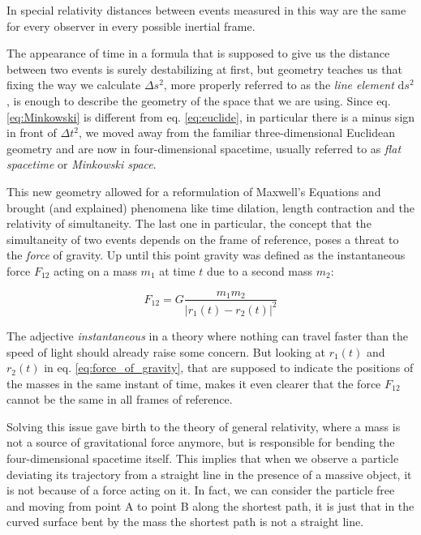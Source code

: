 In special relativity distances between events measured in this way are the same
for every observer in every possible inertial frame.

The appearance of time in a formula that is supposed to give us the distance
between two events is surely destabilizing at first, but geometry teaches us
that fixing the way we calculate $\Delta s^2$, more properly referred to as the
\textit{line element} $\mathrm{d}s^2$, is enough to describe the geometry of
the space that we are using.
Since eq. \ref{eq:Minkowski} is different from eq. \ref{eq:euclide},
in
particular there is a minus sign in front of $\Delta t^2$, we moved away from
the familiar three-dimensional Euclidean geometry and are now in
four-dimensional spacetime, usually referred to as \textit{flat spacetime} or
\textit{Minkowski space}.

This new geometry allowed for a reformulation of Maxwell's Equations and
brought (and explained) phenomena like time dilation, length contraction and the
relativity of simultaneity.
The last one in particular, the concept that the simultaneity of two events
depends on the frame of reference, poses a threat to the \textit{force} of
gravity.
Up until this point gravity was defined as the instantaneous force $F_{12}$
acting on a mass $m_1$ at time $t$ due to a second mass $m_2$:

\begin{equation}
	F_{12} = G \frac{m_1 m_2}{|r_1(t) - r_2(t)|^2}
	\label{eq:force_of_gravity}
\end{equation}

The adjective \textit{instantaneous} in a theory where nothing can travel
faster than the speed of light should already raise some concern.
But looking at $r_1(t)$ and $r_2(t)$ in eq. \ref{eq:force_of_gravity}, that are
supposed to indicate the positions of the masses in the same instant of time,
makes it even clearer that the force $F_{12}$ cannot be the same in all
frames of reference.

Solving this issue gave birth to the theory of general relativity, where a mass
is not a source of gravitational force anymore, but is responsible for
bending the four-dimensional spacetime itself.
This implies that when we observe a particle deviating its trajectory from a
straight line in the presence of a massive object, it is not because of a force
acting on it.
In fact, we can consider the particle free and moving from point A to point B
along the shortest path, it is just that in the curved surface bent by the mass
the shortest path is not a straight line.

